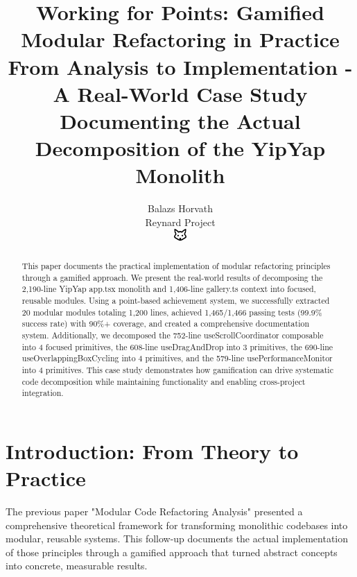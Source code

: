 \documentclass[11pt]{article}
\begin{document}
\title{\textbf{Working for Points: Gamified Modular Refactoring in Practice} \\
\Large{From Analysis to Implementation - A Real-World Case Study} \\
\large{Documenting the Actual Decomposition of the YipYap Monolith}}

\author{Balazs Horvath\\
Reynard Project\\
\includegraphics[width=0.5cm]{../../shared-assets/favicon.pdf}}

\maketitle

\begin{abstract}
This paper documents the practical implementation of modular refactoring principles through a gamified approach. We present the real-world results of decomposing the 2,190-line YipYap app.tsx monolith and 1,406-line gallery.ts context into focused, reusable modules. Using a point-based achievement system, we successfully extracted 20 modular modules totaling 1,200 lines, achieved 1,465/1,466 passing tests (99.9\% success rate) with 90\%+ coverage, and created a comprehensive documentation system. Additionally, we decomposed the 752-line useScrollCoordinator composable into 4 focused primitives, the 608-line useDragAndDrop into 3 primitives, the 690-line useOverlappingBoxCycling into 4 primitives, and the 579-line usePerformanceMonitor into 4 primitives. This case study demonstrates how gamification can drive systematic code decomposition while maintaining functionality and enabling cross-project integration.
\end{abstract}

\tableofcontents
\newpage

\section{Introduction: From Theory to Practice}

The previous paper "Modular Code Refactoring Analysis" presented a comprehensive theoretical framework for transforming monolithic codebases into modular, reusable systems. This follow-up documents the actual implementation of those principles through a gamified approach that turned abstract concepts into concrete, measurable results.
\end{document}
